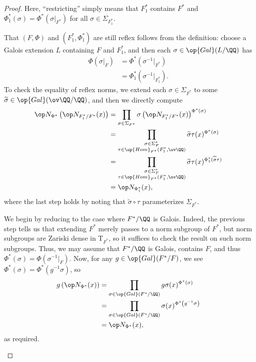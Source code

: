 \documentclass[../thesis.tex]{subfiles}
\begin{document}
\begin{proof}
	Here, ``restricting'' simply means that $F_1^*$ contains $F^*$ and $\Phi_1^*(\sigma)=\Phi^*(\sigma|_{F^*})$ for all $\sigma\in\Sigma_{F_1^*}$.
	\begin{listalph}
		\item That $(F,\Phi)$ and $(F_1^*,\Phi_1^*)$ are still reflex follows from the definition: choose a Galois extension $L$ containing $F$ and $F_1^*$, and then each $\sigma\in\op{Gal}(L/\QQ)$ has
		\begin{align*}
			\Phi(\sigma|_F) &= \Phi^*\left(\sigma^{-1}|_{F^*}\right) \\
			&= \Phi_1^*\left(\sigma^{-1}|_{F_1^*}\right).
		\end{align*}
		To check the equality of reflex norms, we extend each $\sigma\in\Sigma_{F^*}$ to some $\widetilde\sigma\in\op{Gal}(\ov\QQ/\QQ)$, and then we directly compute
		\begin{align*}
			\op N_{\Phi^*}\left(\op N_{F_1^*/F^*}(x)\right) &= \prod_{\sigma\in\Sigma_{F^*}}\sigma\left(\op N_{F_1^*/F^*}(x)\right)^{\Phi^*(\sigma)} \\
			&= \prod_{\substack{\sigma\in\Sigma_F^*\\\tau\in\op{Hom}_{F^*}(F_1^*,\ov\QQ)}}\widetilde\sigma\tau(x)^{\Phi^*(\sigma)} \\
			&= \prod_{\substack{\sigma\in\Sigma_F^*\\\tau\in\op{Hom}_{F^*}(F_1^*,\ov\QQ)}}\widetilde\sigma\tau(x)^{\Phi^*_1(\widetilde\sigma\tau)} \\
			&= \op N_{\Phi_1^*}(x),
		\end{align*}
		where the last step holds by noting that $\widetilde\sigma\circ\tau$ parameterizes $\Sigma_{F^*}$.

		\item We begin by reducing to the case where $F^*/\QQ$ is Galois. Indeed, the previous step tells us that extending $F^*$ merely passes to a norm subgroup of $F^*$, but norm subgroups are Zariski dense in $\mathrm T_{F^*}$, so it suffices to check the result on such norm subgroups. Thus, we may assume that $F^*/\QQ$ is Galois, contains $F$, and thus $\Phi^*(\sigma)=\Phi\left(\sigma^{-1}|_F\right)$. Now, for any $g\in\op{Gal}(F^*/F)$, we see $\Phi^*(\sigma)=\Phi^*\left(g^{-1}\sigma\right)$, so
		\begin{align*}
			g\left(\op N_{\Phi^*}(x)\right) &= \prod_{\sigma\in\op{Gal}(F^*/\QQ)}g\sigma(x)^{\Phi^*(\sigma)} \\
			&= \prod_{\sigma\in\op{Gal}(F^*/\QQ)}\sigma(x)^{\Phi^*\left(g^{-1}\sigma\right)} \\
			&= \op N_{\Phi^*}(x),
		\end{align*}
		as required.
		\qedhere
	\end{listalph}
\end{proof}
\end{document}
